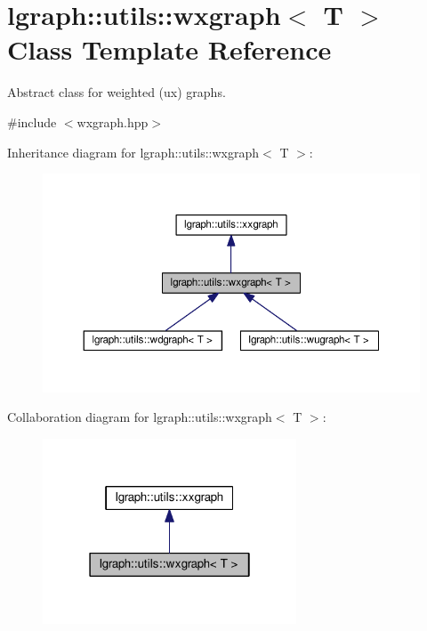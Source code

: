 \hypertarget{classlgraph_1_1utils_1_1wxgraph}{}\section{lgraph\+:\+:utils\+:\+:wxgraph$<$ T $>$ Class Template Reference}
\label{classlgraph_1_1utils_1_1wxgraph}


Abstract class for weighted (ux) graphs.  




{\ttfamily \#include $<$wxgraph.\+hpp$>$}



Inheritance diagram for lgraph\+:\+:utils\+:\+:wxgraph$<$ T $>$\+:\nopagebreak
\begin{figure}[H]
\begin{center}
\leavevmode
\includegraphics[width=350pt]{classlgraph_1_1utils_1_1wxgraph__inherit__graph}
\end{center}
\end{figure}


Collaboration diagram for lgraph\+:\+:utils\+:\+:wxgraph$<$ T $>$\+:\nopagebreak
\begin{figure}[H]
\begin{center}
\leavevmode
\includegraphics[width=214pt]{classlgraph_1_1utils_1_1wxgraph__coll__graph}
\end{center}
\end{figure}
